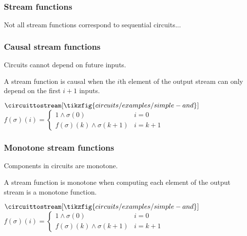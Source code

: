 \begin{frame}
    \frametitle{Stream functions}

    Not all stream functions correspond to sequential circuits...
    
\end{frame}

\begin{frame}
    \frametitle{Causal stream functions}

    Circuits cannot depend on \alert{future inputs}.

    \pause

    A stream function is \alert{causal} when the \(i\)th element of the output stream can only depend on the first \(i+1\) inputs.

    \pause

    \begin{center}
        \(
            \circuittostream[\tikzfig{circuits/examples/simple-and}]{}
        \)
        \qquad
        \(
            f(\sigma)(i) =
            \begin{cases}
                1 \land \sigma(0) & i = 0 \\
                f(\sigma)(k) \land \sigma(k+1) & i = k+1
                
            \end{cases}
        \)
    \end{center}
\end{frame}


\begin{frame}
    \frametitle{Monotone stream functions}

    Components in circuits are \alert{monotone}.

    A stream function is \alert{monotone} when computing each element of the output stream is a monotone function.

    \begin{center}
        \(
            \circuittostream[\tikzfig{circuits/examples/simple-and}]{}
        \)
        \qquad
        \(
            f(\sigma)(i) =
            \begin{cases}
                1 \land \sigma(0) & i = 0 \\
                f(\sigma)(k) \land \sigma(k+1) & i = k+1
                
            \end{cases}
        \)
    \end{center}

\end{frame}

